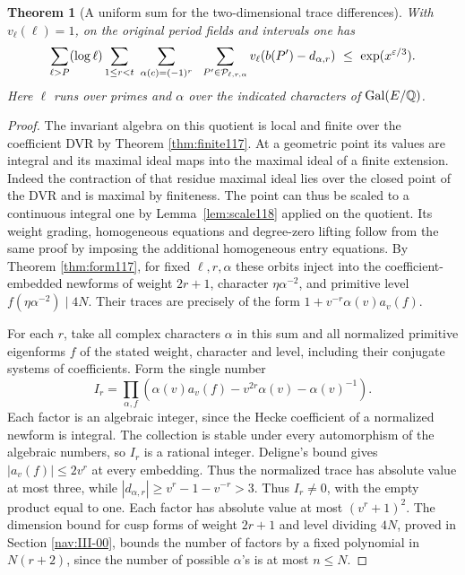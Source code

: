 \documentclass[a4paper,11pt]{article}
\newtheorem{theorem}[proposition]{Theorem}
\theoremstyle{definition}
\theoremstyle{remark}
\numberwithin{equation}{section}
\begin{document}
\begin{theorem}[A uniform sum for the two-dimensional trace differences]
\label{thm:tracebound118}
With \(v_\ell(\ell)=1\), on the original period fields and
intervals one has
\begin{equation}
 \sum_{\ell>P}(\log\ell)\sum_{1\le r<t}
 \ \sum_{\alpha(c)=(-1)^r}\ \
 \sum_{P'\in\mathcal P_{\ell,r,\alpha}}
       v_\ell\!\left(b(P')-d_{\alpha,r}\right)
       \ \le\ \exp(x^{\varepsilon/3}) .                         \label{eq:trace118}
\end{equation}
Here \(\ell\) runs over primes and \(\alpha\) over the indicated
characters of \(\operatorname{Gal}(E/\mathbb Q)\).
\end{theorem}
\begin{proof}
The invariant algebra on this quotient is local and finite over
the coefficient DVR by Theorem \ref{thm:finite117}. At a geometric
point its values are integral and its maximal ideal maps into
the maximal ideal of a finite extension. Indeed the contraction
of that residue maximal ideal lies over the closed point of the
DVR and is maximal by finiteness. The point can thus
be scaled to a continuous integral one by
Lemma~\ref{lem:scale118} applied on the quotient. Its weight
grading, homogeneous equations and degree-zero lifting follow
from the same proof by imposing the additional homogeneous
entry equations. By Theorem \ref{thm:form117}, for fixed
\(\ell,r,\alpha\) these orbits inject into the coefficient-embedded
newforms of weight \(2r+1\), character \(\eta\alpha^{-2}\),
and primitive level \(f(\eta\alpha^{-2})\mid4N\). Their traces
are precisely of the form \(1+v^{-r}\alpha(v)a_v(f)\).

For each \(r\), take all complex characters \(\alpha\) in this
sum and all normalized primitive eigenforms \(f\) of the stated
weight, character and level, including their conjugate systems
of coefficients. Form the single number
\[
 I_r=\prod_{\alpha,f}
   \left(\alpha(v)a_v(f)-v^{2r}\alpha(v)-\alpha(v)^{-1}\right).
\]
Each factor is an algebraic integer, since the Hecke coefficient
of a normalized newform is integral. The collection is stable
under every automorphism of the algebraic numbers, so \(I_r\)
is a rational integer. Deligne's bound gives \(|a_v(f)|\le2v^r\)
at every embedding. Thus the normalized trace has absolute value
at most three, while \(|d_{\alpha,r}|\ge v^r-1-v^{-r}>3\).
Thus \(I_r\ne0\), with the empty product equal to one.
Each factor has absolute value at most \((v^r+1)^2\).
The dimension bound for cusp forms of weight \(2r+1\) and
level dividing \(4N\), proved in
Section \ref{nav:III-00},
bounds the number of factors by a fixed polynomial in \(N(r+2)\),
since the number of possible \(\alpha\)'s is at most \(n\le N\).


\end{proof}
\end{document}
